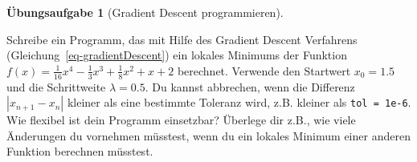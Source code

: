 \documentclass[
  a4paper,
  DIV=11]{scrreprt}
\theoremstyle{definition}
\newtheorem{exercise}{Übungsaufgabe}[chapter]
\theoremstyle{definition}
\theoremstyle{remark}
\begin{document}
\begin{exercise}[Gradient Descent
programmieren]\protect\hypertarget{exr-GradientDescentFirstTry}{}\label{exr-GradientDescentFirstTry}

Schreibe ein Programm, das mit Hilfe des Gradient Descent Verfahrens
(Gleichung~\ref{eq-gradientDescent}) ein lokales Minimums der Funktion
\(f(x) = \frac{1}{16}x^4 - \frac{1}{3}x^3 + \frac{1}{8}x^2 + x + 2\)
berechnet. Verwende den Startwert \(x_0 = 1.5\) und die Schrittweite
\(\lambda = 0.5\). Du kannst abbrechen, wenn die Differenz
\(|x_{n+1} - x_n|\) kleiner als eine bestimmte Toleranz wird, z.B.
kleiner als \texttt{tol\ =\ 1e-6}. Wie flexibel ist dein Programm
einsetzbar? Überlege dir z.B., wie viele Änderungen du vornehmen
müsstest, wenn du ein lokales Minimum einer anderen Funktion berechnen
müsstest.

\end{exercise}
\end{document}
